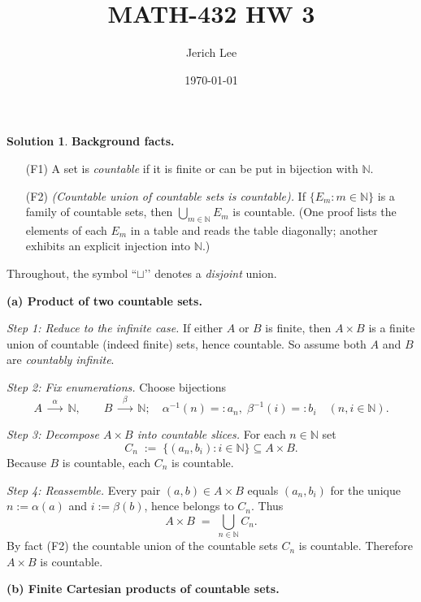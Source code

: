 \documentclass[12pt]{article}
\title{MATH-432 HW 3}
\author{Jerich Lee}
\date{\today}
\theoremstyle{definition} %
\newtheorem{solution}{Solution}
\theoremstyle{plain} %
\begin{document}
\maketitle
\begin{solution}
  \textbf{Background facts.}
  \begin{enumerate}[label=\arabic*.]
      \item[(F1)] A set is \emph{countable} if it is finite or can be put in
            bijection with $\mathbb{N}$.
      \item[(F2)] \emph{(Countable union of countable sets is countable).}  
            If $\{E_m:m\in\mathbb{N}\}$ is a family of countable sets, then
            $\displaystyle\bigcup_{m\in\mathbb{N}}E_m$ is countable.
            (One proof lists the elements of each $E_m$ in a table and reads the
            table diagonally; another exhibits an explicit injection into
            $\mathbb{N}$.)
  \end{enumerate}
  
  Throughout, the symbol ``$\sqcup$’’ denotes a \emph{disjoint} union.
  
  \bigskip
  \textbf{(a)  Product of two countable sets.}
  
  \smallskip
  \emph{Step 1:  Reduce to the infinite case.}
  If either $A$ or $B$ is finite, then $A\times B$ is a finite union of
  countable (indeed finite) sets, hence countable.
  So assume both $A$ and $B$ are \emph{countably infinite}.
  
  \smallskip
  \emph{Step 2:  Fix enumerations.}
  Choose bijections
  \[
      A\;\xrightarrow{\;\ \alpha\;\ }\;\mathbb{N},
      \qquad
      B\;\xrightarrow{\;\ \beta\;\ }\;\mathbb{N};
      \quad
      \alpha^{-1}(n)=:a_n,\;
      \beta^{-1}(i)=:b_i
      \quad(n,i\in\mathbb{N}).
  \]
  
  \smallskip
  \emph{Step 3:  Decompose $A\times B$ into countable slices.}
  For each $n\in\mathbb{N}$ set
  \[
      C_n\;:=\;\{(a_n,b_i): i\in\mathbb{N}\}\subseteq A\times B.
  \]
  Because $B$ is countable, each $C_n$ is countable.
  
  \smallskip
  \emph{Step 4:  Reassemble.}
  Every pair $(a,b)\in A\times B$ equals
  $(a_n,b_i)$ for the unique $n:=\alpha(a)$ and $i:=\beta(b)$,
  hence belongs to $C_n$.
  Thus
  \[
     A\times B \;=\; \bigcup_{n\in\mathbb{N}} C_n.
  \]
  By fact (F2) the countable union of the countable sets $C_n$
  is countable.
  Therefore $A\times B$ is countable.
  
  \bigskip
  \textbf{(b)  Finite Cartesian products of countable sets.}
  

\end{solution}
\end{document}
